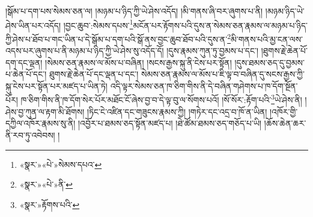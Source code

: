 །སྒོམ་པ་དག་པས་སེམས་ཅན་ལ། །མཉམ་པ་ཉིད་ཀྱི་ཡེ་ཤེས་འདོད། །མི་གནས་ཞི་བར་ཞུགས་པ་ནི། །མཉམ་ཉིད་ཡེ་ཤེས་ཡིན་པར་འདོད། །བྱང་ཆུབ་:སེམས་དཔས་\footnote{«སྣར་»«པེ་»སེམས་དཔའ་}མངོན་པར་རྟོགས་པའི་དུས་ན་སེམས་ཅན་རྣམས་ལ་མཉམ་པ་ཉིད་ཀྱི་ཤེས་པ་ཐོབ་པ་གང་ཡིན་པ་དེ་སྒོམ་པ་དག་པའི་སྒོ་ནས་བྱང་ཆུབ་ཐོབ་པའི་དུས་ན་\footnote{«སྣར་»«པེ་»ནི་}མི་གནས་པའི་མྱ་ངན་ལས་འདས་པར་ཞུགས་པ་ནི་མཉམ་པ་ཉིད་ཀྱི་ཡེ་ཤེས་སུ་འདོད་དོ། །དུས་རྣམས་ཀུན་ཏུ་བྱམས་པ་དང་། །ཐུགས་རྗེ་ཆེན་པོ་དག་དང་ལྡན། །སེམས་ཅན་རྣམས་ལ་མོས་པ་བཞིན། །སངས་རྒྱས་སྐུ་ནི་ངེས་པར་སྟོན། །དུས་ཐམས་ཅད་དུ་བྱམས་པ་ཆེན་པོ་དང་། ཐུགས་རྗེ་ཆེན་པོ་དང་ལྡན་པ་དང་། སེམས་ཅན་རྣམས་ལ་མོས་པ་ཇི་ལྟ་བ་བཞིན་དུ་སངས་རྒྱས་ཀྱི་སྐུ་ངེས་པར་སྟོན་པར་མཛད་པ་ཡིན་ཏེ། འདི་ལྟར་སེམས་ཅན་ཁ་ཅིག་གིས་ནི་དེ་བཞིན་གཤེགས་པ་ཁ་དོག་སྔོན་པོར། ཁ་ཅིག་གིས་ནི་ཁ་དོག་སེར་པོར་མཐོང་ངོ་ཞེས་བྱ་བ་དེ་ལྟ་བུ་ལ་སོགས་པའོ། །སོ་སོར་:རྟོག་པའི་\footnote{«སྣར་»རྟོགས་པའི་}ཡེ་ཤེས་ནི། །ཤེས་བྱ་ཀུན་ལ་རྟག་མི་ཐོགས། །ཏིང་ངེ་འཛིན་དང་གཟུངས་རྣམས་ཀྱི། །གཏེར་དང་འདྲ་བ་ཁོ་ན་ཡིན། །འཁོར་གྱི་དཀྱིལ་འཁོར་རྣམས་སུ་ནི། །འབྱོར་པ་ཐམས་ཅད་སྟོན་མཛད་པ། །ཐེ་ཚོམ་ཐམས་ཅད་གཅོད་པ་ཡི། །ཆོས་ཆེན་ཆར་ནི་རབ་ཏུ་འབེབས། །
